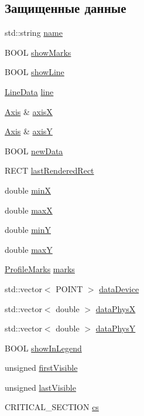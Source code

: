 \subsection*{Защищенные данные}
\begin{DoxyCompactItemize}
\item 
std\-::string \hyperlink{class_profile_ac8a75db2da9448616fb180edcc25bf8c}{name}
\item 
B\-O\-O\-L \hyperlink{class_profile_a07364e07ee0c925c0b2a7631c666056b}{show\-Marks}
\item 
B\-O\-O\-L \hyperlink{class_profile_a7e12899117a7229fd74e727d4c7508aa}{show\-Line}
\item 
\hyperlink{class_line_data}{Line\-Data} \hyperlink{class_profile_a63eba30a8236070b9ed979e1ebdd8709}{line}
\item 
\hyperlink{class_axis}{Axis} \& \hyperlink{class_profile_a9ab5958c5e36ddb1c8dc96773bfbaeb6}{axis\-X}
\item 
\hyperlink{class_axis}{Axis} \& \hyperlink{class_profile_af934163fd90437181ce2125860214cd0}{axis\-Y}
\item 
B\-O\-O\-L \hyperlink{class_profile_a2a37b4d72a0c1dcefcf65aa6474d8ca3}{new\-Data}
\item 
R\-E\-C\-T \hyperlink{class_profile_a21fbb7028f71f681ad6becd412f34e07}{last\-Rendered\-Rect}
\item 
double \hyperlink{class_profile_a7ec1de15af31223a7cba55fb711ce2c5}{min\-X}
\item 
double \hyperlink{class_profile_a3d4ffb95639a391469dc7f5b97fba63b}{max\-X}
\item 
double \hyperlink{class_profile_ab65307e12c8d002effb1de3598d47e00}{min\-Y}
\item 
double \hyperlink{class_profile_ac16836105d7961c71046014887d3cb71}{max\-Y}
\item 
\hyperlink{class_profile_marks}{Profile\-Marks} \hyperlink{class_profile_afb294101d0593f41db3f20fb1e678906}{marks}
\item 
std\-::vector$<$ P\-O\-I\-N\-T $>$ \hyperlink{class_profile_a7143abb96dc0d5ef1b152d1ce0ee8dac}{data\-Device}
\item 
std\-::vector$<$ double $>$ \hyperlink{class_profile_a9b8d3156a467dc594b39ee8224b659c3}{data\-Phys\-X}
\item 
std\-::vector$<$ double $>$ \hyperlink{class_profile_acb59691aee18d478753d4aedfafc8787}{data\-Phys\-Y}
\item 
B\-O\-O\-L \hyperlink{class_profile_a09c7baa3c0a3b1762f8c0eed5223868f}{show\-In\-Legend}
\item 
unsigned \hyperlink{class_profile_a877766d4f4ee2eb4f63220ebbbcf2e69}{first\-Visible}
\item 
unsigned \hyperlink{class_profile_ad48970e92143859da4f950c1c8fee217}{last\-Visible}
\item 
C\-R\-I\-T\-I\-C\-A\-L\-\_\-\-S\-E\-C\-T\-I\-O\-N \hyperlink{class_profile_a11aa9c768f5ff249dda920c04b886cd9}{cs}
\end{DoxyCompactItemize}


